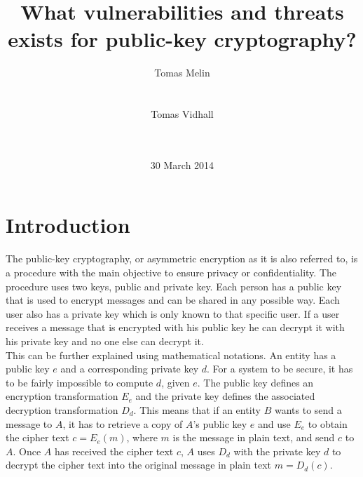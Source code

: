\documentclass{acm_proc_article-sp}
\begin{document}
\title{What vulnerabilities and threats exists for public-key cryptography?}
\author{
\alignauthor
Tomas Melin\\
        \\
        \\
\alignauthor
Tomas Vidhall\\
        \\
        \\
}
\date{30 March 2014}
%   
%

\maketitle
\begin{abstract}
\end{abstract}


\section{Introduction}
The public-key cryptography, or asymmetric encryption as it is also referred to, is a procedure with the main objective to ensure privacy or %
confidentiality. The procedure uses two keys, public and private key. Each person has a public key that is used to encrypt messages and can be shared in any possible way. Each user also has a private key which is only known to that specific user. If a user receives a message that is encrypted with his public key he can decrypt it with his private key and no one else can decrypt it. \\
This can be further explained using mathematical notations. An entity has a public key $e$ and a corresponding private key $d$. For a system to be secure, it has to be fairly impossible to compute $d$, given $e$. The public key defines an encryption transformation $E_e$ and the private key defines the associated decryption transformation $D_d$. This means that if an entity $B$ wants to send a message to $A$, it has to retrieve a copy of $A$'s public key $e$ and use $E_e$ to obtain the cipher text $c=E_e(m)$, where $m$ is the message in plain text, and send $c$ to $A$. Once $A$ has received the cipher text $c$, $A$ uses $D_d$ with the private key $d$ to decrypt the cipher text into the original message in plain text $m=D_d(c)$. \cite{handcrypt}\\
\end{document}
